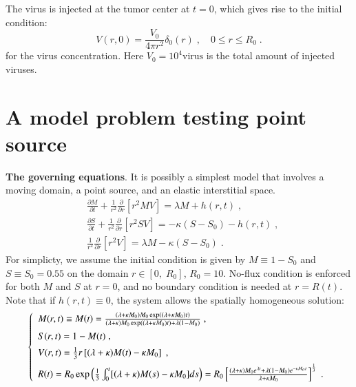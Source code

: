 \documentclass[reqno]{amsart}
\theoremstyle{definition}
\theoremstyle{remark}
\numberwithin{equation}{section}
\numberwithin{figure}{section}
\newcommand{\po}[1]{\frac{\partial}{\partial{#1}}}
\newcommand{\pp}[2]{\frac{\partial {#1}}{\partial {#2}}}
\begin{document}
The virus is injected at the tumor center at $t=0$, which gives rise to the initial condition:
\begin{equation}\label{eq:eqn_pde_virus_ic}
  V(r,0) = \frac{V_0}{4\pi r^2}\delta_0(r)\;,\quad0\le r\le R_0\;.
\end{equation}
for the virus concentration.
Here {\color{cyan}$V_0 = 10^4\textrm{virus}$} is the total amount of injected viruses.

\section{A model problem testing point source}
\label{sec:model}
{\bf The governing equations}.
It is possibly a simplest model that involves a moving domain, a point source, and an elastic interstitial space. 
\begin{subequations}\label{eq:model_pde}
  \begin{align}
    \label{eq:model_pde_m}
    &\pp{M}{t} + \frac{1}{r^2}\po{r}\left[r^2MV\right] = \lambda M + h(r,t)\;,\\
    \label{eq:model_pde_s}
    &\pp{S}{t} + \frac{1}{r^2}\po{r}\left[r^2SV\right] = -\kappa(S-S_0)-h(r,t)\;,\\
    \label{eq:model_pde_v}
    &\frac{1}{r^2}\po{r}\left[r^2 V\right] = \lambda M-\kappa(S-S_0)\;.
  \end{align}
\end{subequations}
For simplicty, we assume the initial condition is given by $M\equiv1-S_0$ and $S\equiv S_0=0.55$ on the domain $r\in[0,\;R_0]$, $R_0=10$.
No-flux condition is enforced for both $M$ and $S$ at $r=0$, and no boundary condition is needed at $r=R(t)$.
Note that if $h(r,t)\equiv0$, the system allows the spatially homogeneous solution:
\begin{equation}\label{eq:model_hom_sol}
  \left\{\begin{array}{l}
    M(r,t) \equiv M(t) = \frac{(\lambda+\kappa M_0)M_0\exp((\lambda+\kappa M_0)t)}{(\lambda+\kappa)M_0\exp((\lambda+\kappa M_0)t)+\lambda(1-M_0)}\;,\\ \vspace*{-.1in} \\
    S(r,t) = 1-M(t)\;,\\ \vspace*{-.1in} \\
    V(r,t) = \frac{1}{3}r\left[(\lambda+\kappa)M(t)-\kappa M_0\right]\;, \\ \vspace*{-.1in} \\
    R(t) = R_0\exp\left(\frac{1}{3}\int_0^t[(\lambda+\kappa)M(s)-\kappa M_0]ds\right)
         = R_0\left[\frac{(\lambda+\kappa)M_0e^{\lambda t}+\lambda(1-M_0)e^{-\kappa M_ot}}{\lambda + \kappa M_0}\right]^{\frac{1}{3}}\;.
  \end{array}\right.
\end{equation}
\end{document}

